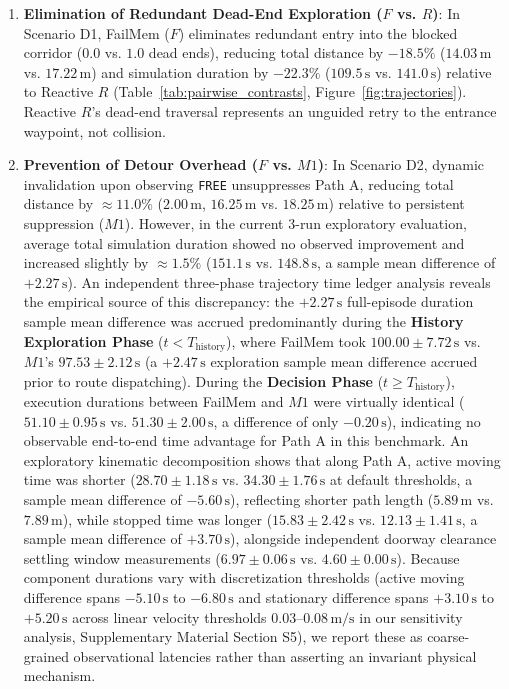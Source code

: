 \begin{enumerate}
    \item \textbf{Elimination of Redundant Dead-End Exploration ($F$ vs. $R$)}: In Scenario D1, FailMem ($F$) eliminates redundant entry into the blocked corridor ($0.0$ vs. $1.0$ dead ends), reducing total distance by $-18.5\%$ ($14.03\,\text{m}$ vs. $17.22\,\text{m}$) and simulation duration by $-22.3\%$ ($109.5\,\text{s}$ vs. $141.0\,\text{s}$) relative to Reactive $R$ (Table~\ref{tab:pairwise_contrasts}, Figure~\ref{fig:trajectories}). Reactive $R$'s dead-end traversal represents an unguided retry to the entrance waypoint, not collision.
    \item \textbf{Prevention of Detour Overhead ($F$ vs. $M1$)}: In Scenario D2, dynamic invalidation upon observing \texttt{FREE} unsuppresses Path A, reducing total distance by $\approx 11.0\%$ ($2.00\,\text{m}$, $16.25\,\text{m}$ vs. $18.25\,\text{m}$) relative to persistent suppression ($M1$). However, in the current 3-run exploratory evaluation, average total simulation duration showed no observed improvement and increased slightly by $\approx 1.5\%$ ($151.1\,\text{s}$ vs. $148.8\,\text{s}$, a sample mean difference of $+2.27\,\text{s}$). An independent three-phase trajectory time ledger analysis reveals the empirical source of this discrepancy: the $+2.27\,\text{s}$ full-episode duration sample mean difference was accrued predominantly during the \textbf{History Exploration Phase} ($t < T_{\text{history}}$), where FailMem took $100.00 \pm 7.72\,\text{s}$ vs. $M1$'s $97.53 \pm 2.12\,\text{s}$ (a $+2.47\,\text{s}$ exploration sample mean difference accrued prior to route dispatching). During the \textbf{Decision Phase} ($t \ge T_{\text{history}}$), execution durations between FailMem and $M1$ were virtually identical ($51.10 \pm 0.95\,\text{s}$ vs. $51.30 \pm 2.00\,\text{s}$, a difference of only $-0.20\,\text{s}$), indicating no observable end-to-end time advantage for Path A in this benchmark. An exploratory kinematic decomposition shows that along Path A, active moving time was shorter ($28.70 \pm 1.18\,\text{s}$ vs. $34.30 \pm 1.76\,\text{s}$ at default thresholds, a sample mean difference of $-5.60\,\text{s}$), reflecting shorter path length ($5.89\,\text{m}$ vs. $7.89\,\text{m}$), while stopped time was longer ($15.83 \pm 2.42\,\text{s}$ vs. $12.13 \pm 1.41\,\text{s}$, a sample mean difference of $+3.70\,\text{s}$), alongside independent doorway clearance settling window measurements ($6.97 \pm 0.06\,\text{s}$ vs. $4.60 \pm 0.00\,\text{s}$). Because component durations vary with discretization thresholds (active moving difference spans $-5.10\,\text{s}$ to $-6.80\,\text{s}$ and stationary difference spans $+3.10\,\text{s}$ to $+5.20\,\text{s}$ across linear velocity thresholds $0.03\text{--}0.08\,\text{m/s}$ in our sensitivity analysis, Supplementary Material Section S5), we report these as coarse-grained observational latencies rather than asserting an invariant physical mechanism.

\end{enumerate}
